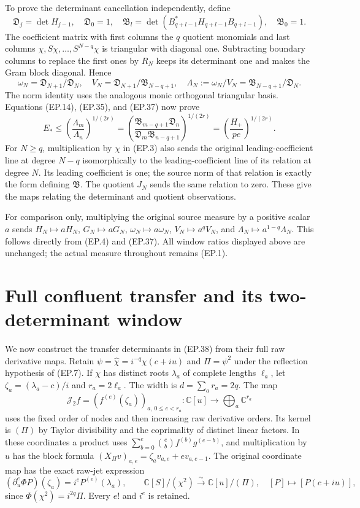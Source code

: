 \documentclass[11pt]{article}
\newcommand{\C}{\mathbb C}\newcommand{\R}{\mathbb R}
\begin{document}
To prove the determinant cancellation independently, define
\[
 \mathfrak D_j=\det H_{j-1},\quad\mathfrak D_0=1,\quad
 \mathfrak B_l=\det(B_{q+l-1}^*H_{q+l-1}B_{q+l-1}),
 \quad\mathfrak B_0=1.\tag{EP.36}
\]
The coefficient matrix with first columns the $q$ quotient monomials
and last columns $\chi,S\chi,\ldots,S^{N-q}\chi$ is triangular
with diagonal one. Subtracting boundary columns to replace the first
ones by $R_N$ keeps its determinant one and makes the Gram block
diagonal. Hence
\[
 \omega_N=\mathfrak D_{N+1}/\mathfrak D_N,\quad
 V_N=\mathfrak D_{N+1}/\mathfrak B_{N-q+1},\quad
 \Lambda_N:=\omega_N/V_N=\mathfrak B_{N-q+1}/\mathfrak D_N.
\tag{EP.37}
\]
The norm identity uses the analogous monic orthogonal triangular
basis. Equations (EP.14), (EP.35), and (EP.37) now prove
\[
 \boxed{E_*\le\left(\frac{\Lambda_m}{\Lambda_n}\right)^{1/(2r)}
 =\left(\frac{\mathfrak B_{m-q+1}\mathfrak D_n}
 {\mathfrak D_m\mathfrak B_{n-q+1}}\right)^{1/(2r)}
 =\left(\frac{H_+}{pe}\right)^{1/(2r)}.}\tag{EP.38}
\]
For $N\ge q$, multiplication by $\chi$ in (EP.3) also sends the original
leading-coefficient line at degree $N-q$ isomorphically to the
leading-coefficient line of its relation at degree $N$. Its leading
coefficient is one; the source norm of that relation is exactly the
form defining $\mathfrak B$. The quotient $J_N$ sends the same
relation to zero. These give the maps relating the determinant and
quotient observations.

For comparison only, multiplying the original source measure by a
positive scalar $a$ sends $H_N\mapsto aH_N$, $G_N\mapsto aG_N$,
$\omega_N\mapsto a\omega_N$, $V_N\mapsto a^qV_N$, and
$\Lambda_N\mapsto a^{1-q}\Lambda_N$. This follows directly from
(EP.4) and (EP.37). All window ratios displayed above are unchanged;
the actual measure throughout remains (EP.1).

\section{Full confluent transfer and its two-determinant window}
We now construct the transfer determinants in (EP.38) from their full
raw derivative maps. Retain $\psi=\widehat\chi=i^{-q}\chi(c+iu)$
and $\Pi=\psi^2$ under the reflection hypothesis of (EP.7). If
$\chi$ has distinct roots $\lambda_a$ of complete lengths $\ell_a$,
let $\zeta_a=(\lambda_a-c)/i$ and $r_a=2\ell_a$.
The width is $d=\sum_a r_a=2q$. The map
\[
 \mathcal J_2 f=(f^{(e)}(\zeta_a))_{a,\,0\le e<r_a}:
 \C[u]\longrightarrow\bigoplus_a\C^{r_a}\tag{EP.38a}
\]
uses the fixed order of nodes and then increasing raw derivative
orders. Its kernel is $(\Pi)$ by Taylor divisibility and the
coprimality of distinct linear factors. In these coordinates a product
uses $\sum_{b=0}^e\binom eb f^{(b)}g^{(e-b)}$, and multiplication
by $u$ has the block formula
$(X_\Pi v)_{a,e}=\zeta_av_{a,e}+e v_{a,e-1}$.
The original coordinate map has the exact raw-jet expression
\[
 (\partial_u^e\Phi P)(\zeta_a)=i^eP^{(e)}(\lambda_a),\qquad
 \C[S]/(\chi^2)\xrightarrow{\sim}\C[u]/(\Pi),\quad
 [P]\mapsto[P(c+iu)],\tag{EP.38b}
\]
since $\Phi(\chi^2)=i^{2q}\Pi$. Every $e!$ and $i^e$ is retained.
\end{document}
